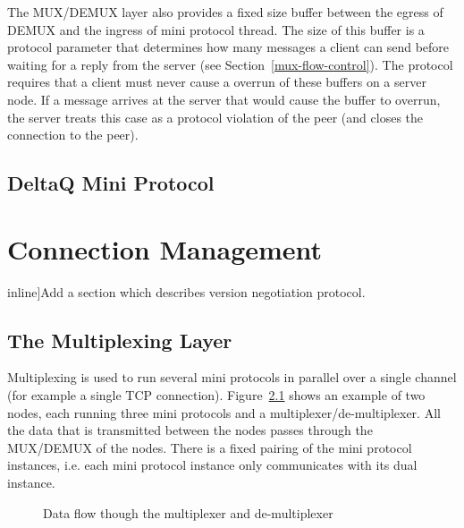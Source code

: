 \documentclass{report}
\newcommand{\wip}[1]{}
\newcommand{\hide}[1]{}
\theoremstyle{definition}{
  \newtheorem{lemma}{Lemma}[section] %
  \newtheorem{definition}[lemma]{Definition}
}
\theoremstyle{theorem}{
  \newtheorem{invariant}[lemma]{Invariant}
  \newtheorem{proofobligation}[lemma]{Proof Obligation}
}
\numberwithin{equation}{lemma}
\begin{document}
The MUX/DEMUX layer also provides a fixed size buffer between the egress of DEMUX and the ingress
of mini protocol thread.
The size of this buffer is a protocol parameter that determines how many messages
a client can send before waiting for a reply from the server (see Section~\ref{mux-flow-control}).
The protocol requires that a client must never cause a overrun of these buffers on a server node.
If a message arrives at the server that would cause the buffer to overrun,
the server treats this case as a protocol violation of the peer
(and closes the connection to the peer).
\hide{
The buffer sizes are listed in Table~\ref{bla} in Section~\ref{blub}.
}
\section{DeltaQ Mini Protocol}
\wip{
  WIP : Explain DeltaQ measurement back pressure and how we deal with slow connection.
  See Section~\ref{deltaq-discussion}.
The DeltaQ mini protocol does not transmit is own messages.
Instead it relies on the time stamps that the multiplexing layer (Section~\ref{multiplexing}) adds
to the messages of other mini protocols.
}

\chapter{Connection Management}
\label{connection-management}
\hide[inline]{Add a section which describes version negotiation protocol.}

\section{The Multiplexing Layer}
\label{multiplexing-section}
Multiplexing is used to run several mini protocols in parallel over a single
channel (for example a single TCP connection).
Figure~\ref{mux-diagram} shows an example of two nodes, each running three
mini protocols and a multiplexer/de-multiplexer.
All the data that is transmitted between the nodes passes through the MUX/DEMUX of the nodes.
There is a fixed pairing of the mini protocol instances, i.e. each mini protocol instance only
communicates with its dual instance.

\begin{figure}[ht]
\begin{center}
\end{center}
\caption{Data flow though the multiplexer and de-multiplexer}
\label{mux-diagram}
\end{figure}
\end{document}
